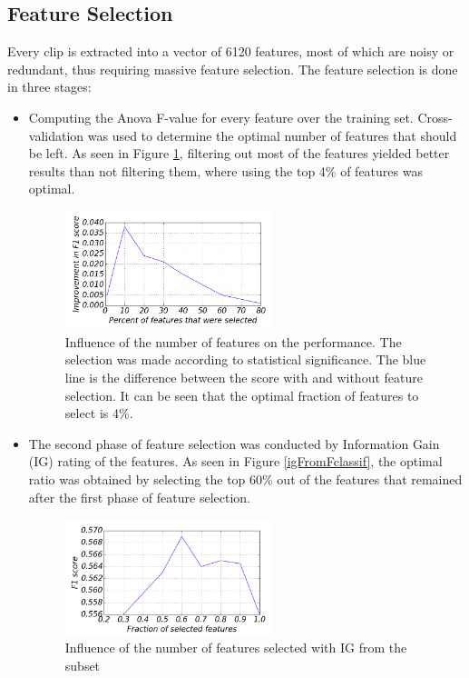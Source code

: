 \documentclass[journal]{journal}
\begin{document}
\subsection{Feature Selection}
Every clip is extracted into a vector of 6120 features, most of which are noisy or redundant, thus requiring massive feature selection. The feature selection is done in three stages:
	\begin{itemize}
		\item
		Computing the Anova F-value for every feature over the training set. Cross-validation was used to determine the optimal number of features that should be
		left. As seen in Figure  \ref{selection}, filtering out most of the features yielded better          results than not filtering them, where using the top 4\% of features was optimal.
		\begin{figure}[ht!]
			\centering
			\includegraphics[width=60mm]{featureSelection.png}
			\caption{Influence of the number of features on the performance. The
			selection was made according to statistical significance.
			The blue line is the difference between the score with and without feature
			selection. It can be seen that the optimal fraction of features to select is
			4\%.}
			\label{selection}
			\end{figure}
		\item
			The second phase of feature selection was conducted by Information Gain (IG) rating of the features. As seen in Figure  \ref{igFromFclassif}, the optimal ratio was obtained by selecting the top 60\% out of the features that remained after the first
			phase of feature selection.
			 \begin{figure}[h]
				\centering
				\includegraphics[width=60mm]{igFromFclassif.png}
				\caption{Influence of the number of features selected with IG from the subset
}
\end{figure}
\end{itemize}
\end{document}
